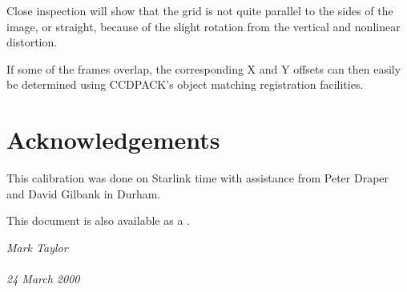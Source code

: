 \documentclass[11pt]{article}
\begin{document}
\begin{quote}
\begin{center}
\end{center}
\end{quote}
Close inspection will show that the grid is not quite parallel to the 
sides of the image, or straight, 
because of the slight rotation from the vertical and nonlinear distortion.

If some of the frames overlap, the corresponding X and Y 
offsets can then easily be determined 
using CCDPACK's object matching registration facilities.


\section*{Acknowledgements}

This calibration was done on Starlink time with assistance from 
Peter Draper and David Gilbank in Durham.

\begin{htmlonly}
\htmlrule
This document is also available as a
.
\end{htmlonly}


\latexhtml{\vspace{\fill}}{\htmlrule}

\begin{flushright}
\it
Mark Taylor \\
 \\
24 March 2000
\end{flushright}
\end{document}
